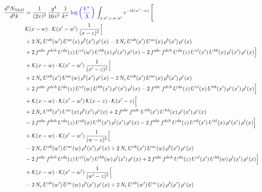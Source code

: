 \documentclass[9pt]{article}
\numberwithin{equation}{section}
\begin{document}
\begin{align}
\frac{d^{3}N_{\mathrm{NLO}}}{d^{3}k} & = \frac{1}{(2\pi)^{3}}\,\frac{g^{4}}{16\pi^{5}}\,\frac{1}{k^{+}}\,{\color{blue}\log{\left(\frac{k^{+}}{\Lambda}\right)}}\,\int_{x,x',z,w,w'}e^{-ik(w'-w)}\,\Bigg[
\notag \\ & \mathcal{K}(x-w)\cdot\mathcal{K}(x'-w')\,\frac{1}{(x-z)^{2}}\Big[\notag\\
&+2\,N_{c}\,U^{ab}(w')\,U^{ac}(x)\,\rho^{b}(x')\,\rho^{c}(x) -2\,N_{c}\,U^{ab}(x')\,U^{ac}(x)\,\rho^{b}(x')\,\rho^{c}(x)\notag\\
& +2\,f^{abc}\,f^{deh}\,U^{da}(z)\,U^{el}(w')\,U^{hb}(x)\,\rho^{l}(x')\,\rho^{c}(x) -2\,f^{abc}\,f^{deh}\,U^{da}(z)\,U^{el}(x')\,U^{hb}(x)\,\rho^{l}(x')\,\rho^{c}(x)\Big]\notag\\
& +\mathcal{K}(x-w)\cdot\mathcal{K}(x'-w')\,\frac{1}{(x'-z)^{2}}\Big[\notag\\
& +2\,N_{c}\,U^{ab}(x')\,U^{ac}(w)\,\rho^{b}(x')\,\rho^{c}(x) -2\,N_{c}\,U^{ab}(x')\,U^{ac}(x)\,\rho^{b}(x')\,\rho^{c}(x)\notag\\
& +2\,f^{abc}\,f^{deh}\,U^{da}(z)\,U^{el}(w)\,U^{hb}(x')\,\rho^{c}(x')\,\rho^{l}(x) -2\,f^{abc}\,f^{deh}\,U^{da}(z)\,U^{el}(x)\,U^{hb}(x')\,\rho^{c}(x')\,\rho^{l}(x)\Big]\notag\\
& +\mathcal{K}(x-w)\cdot\mathcal{K}(x'-w')\,\mathcal{K}(x-z)\cdot\mathcal{K}(x'-z)\Big[\notag\\
& +2\,N_{c}\,U^{ab}(x')\,U^{ac}(x)\,\rho^{b}(x')\,\rho^{c}(x) +2\,f^{abc}\,f^{ade}\,U^{hb}(x')\,U^{hd}(x)\,\rho^{c}(x')\,\rho^{e}(x)\notag\\
& -2\,f^{abc}\,f^{deh}\,U^{da}(z)\,U^{eb}(x)\,U^{hl}(x')\,\rho^{l}(x')\,\rho^{c}(x) -2\,f^{abc}\,f^{deh}\,U^{da}(z)\,U^{eb}(x')\,U^{hl}(x)\,\rho^{c}(x')\,\rho^{l}(x)\Big]\notag\\
& +\mathcal{K}(x-w)\cdot\mathcal{K}(x'-w')\,\frac{1}{(w-z)^{2}}\Big[\notag\\
& -2\,N_{c}\,U^{ab}(w')\,U^{ac}(w)\,\rho^{b}(x')\,\rho^{c}(x) +2\,N_{c}\,U^{ab}(x')\,U^{ac}(w)\,\rho^{b}(x')\,\rho^{c}(x)\notag\\
& -2\,f^{abc}\,f^{deh}\,U^{da}(z)\,U^{el}(w')\,U^{hb}(w)\,\rho^{l}(x')\,\rho^{c}(x) +2\,f^{abc}\,f^{deh}\,U^{da}(z)\,U^{el}(x')\,U^{hb}(w)\,\rho^{l}(x')\,\rho^{c}(x)\Big]\notag\\
& +\mathcal{K}(x-w)\cdot\mathcal{K}(x'-w')\,\frac{1}{(w'-z)^{2}}\Big[\notag\\
& -2\,N_{c}\,U^{ab}(w')\,U^{ac}(w)\,\rho^{b}(x')\,\rho^{c}(x) +2\,N_{c}\,U^{ab}(w')\,U^{ac}(x)\,\rho^{b}(x')\,\rho^{c}(x)\notag\\

\end{align}
\end{document}
